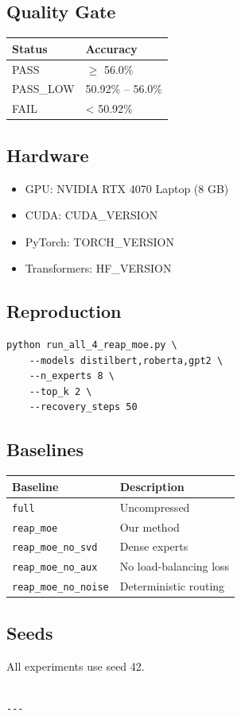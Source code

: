 \subsection{Quality Gate}

\begin{table}[H]
\centering
\small
\begin{tabular}{ll}
\toprule
\textbf{Status} & \textbf{Accuracy} \\
\midrule
PASS & $\ge$ 56.0\% \\
PASS\_LOW & 50.92\% -- 56.0\% \\
FAIL & < 50.92\% \\
\bottomrule
\end{tabular}
\end{table}

\subsection{Hardware}

\begin{itemize}
\item GPU: NVIDIA RTX 4070 Laptop (8 GB)
\item CUDA: {{CUDA\_VERSION}}
\item PyTorch: {{TORCH\_VERSION}}
\item Transformers: {{HF\_VERSION}}

\end{itemize}
\subsection{Reproduction}

\begin{lstlisting}
python run_all_4_reap_moe.py \
    --models distilbert,roberta,gpt2 \
    --n_experts 8 \
    --top_k 2 \
    --recovery_steps 50
\end{lstlisting}

\subsection{Baselines}

\begin{table}[H]
\centering
\small
\begin{tabular}{ll}
\toprule
\textbf{Baseline} & \textbf{Description} \\
\midrule
\texttt{full} & Uncompressed \\
\texttt{reap\_moe} & Our method \\
\texttt{reap\_moe\_no\_svd} & Dense experts \\
\texttt{reap\_moe\_no\_aux} & No load-balancing loss \\
\texttt{reap\_moe\_no\_noise} & Deterministic routing \\
\bottomrule
\end{tabular}
\end{table}

\subsection{Seeds}

All experiments use seed 42.
\begin{lstlisting}

---
\end{lstlisting}
